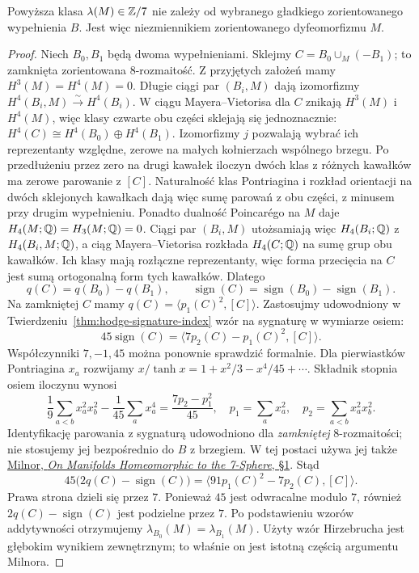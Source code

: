 \begin{twierdzenie}
\label{thm:milnor-invariant-25}
Powyższa klasa $\lambda(M)\in\mathbb{Z}/7$
nie zależy od wybranego gładkiego
zorientowanego wypełnienia $B$.
Jest więc niezmiennikiem
zorientowanego dyfeomorfizmu $M$.
\end{twierdzenie}
\begin{proof}
Niech $B_0,B_1$ będą dwoma
wypełnieniami. Sklejmy
$C=B_0\cup_M(-B_1)$;
to zamknięta zorientowana
$8$-rozmaitość. Z przyjętych założeń
mamy $H^3(M)=H^4(M)=0$.
Długie ciągi par $(B_i,M)$ dają
izomorfizmy
$H^4(B_i,M)\xrightarrow{\sim}H^4(B_i)$.
W ciągu Mayera--Vietorisa dla $C$
znikają $H^3(M)$ i $H^4(M)$,
więc klasy czwarte obu części
sklejają się jednoznacznie:
$H^4(C)\cong H^4(B_0)\oplus H^4(B_1)$.
Izomorfizmy $j$ pozwalają wybrać
ich reprezentanty względne, zerowe
na małych kołnierzach wspólnego brzegu.
Po przedłużeniu przez zero na drugi
kawałek iloczyn dwóch klas z różnych
kawałków ma zerowe parowanie z $[C]$.
Naturalność klas Pontriagina i rozkład
orientacji na dwóch sklejonych
kawałkach dają więc
sumę parowań z obu części, z minusem
przy drugim wypełnieniu. Ponadto
dualność Poincarégo na $M$ daje
$H_4(M;\mathbb{Q})=H_3(M;\mathbb{Q})=0$.
Ciągi par $(B_i,M)$ utożsamiają więc
$H_4(B_i;\mathbb{Q})$ z $H_4(B_i,M;\mathbb{Q})$,
a ciąg Mayera--Vietorisa rozkłada
$H_4(C;\mathbb{Q})$ na sumę grup obu kawałków.
Ich klasy mają rozłączne reprezentanty,
więc forma przecięcia na $C$ jest
sumą ortogonalną form tych kawałków.
Dlatego
\[
 q(C)=q(B_0)-q(B_1),\qquad
 \operatorname{sign}(C)
  =\operatorname{sign}(B_0)
   -\operatorname{sign}(B_1).
\]
Na zamkniętej $C$ mamy
$q(C)=\langle p_1(C)^2,[C]\rangle$.
Zastosujmy udowodniony w
Twierdzeniu~\ref{thm:hodge-signature-index}
wzór na sygnaturę w wymiarze osiem:
\[
 45\operatorname{sign}(C)=
 \langle 7p_2(C)-p_1(C)^2,[C]\rangle.
\]
Współczynniki $7,-1,45$ można ponownie
sprawdzić formalnie. Dla pierwiastków
Pontriagina $x_a$ rozwijamy
$x/\tanh x=1+x^2/3-x^4/45+\cdots$.
Składnik stopnia osiem iloczynu wynosi
\[
 \frac1{9}\sum_{a<b}x_a^2x_b^2
 -\frac1{45}\sum_a x_a^4
 =\frac{7p_2-p_1^2}{45},
 \quad p_1=\sum_a x_a^2,\quad
 p_2=\sum_{a<b}x_a^2x_b^2.
\]
Identyfikację parowania z sygnaturą
udowodniono dla \emph{zamkniętej}
$8$-rozmaitości; nie stosujemy jej
bezpośrednio do $B$ z brzegiem. W tej
postaci używa jej także
\href{https://sites.math.rutgers.edu/~feehan/teaching/math866/milnor7sphere.pdf}
{Milnor, \emph{On Manifolds Homeomorphic
to the 7-Sphere}, §1}.
Stąd
\[
 45\bigl(2q(C)-\operatorname{sign}(C)\bigr)
 =
 \langle 91p_1(C)^2-7p_2(C),[C]\rangle.
\]
Prawa strona dzieli się przez $7$.
Ponieważ $45$ jest odwracalne
modulo $7$, również
$2q(C)-\operatorname{sign}(C)$
jest podzielne przez $7$.
Po podstawieniu wzorów
addytywności otrzymujemy
$\lambda_{B_0}(M)=\lambda_{B_1}(M)$.
Użyty wzór Hirzebrucha jest
głębokim wynikiem zewnętrznym;
to właśnie on jest istotną
częścią argumentu Milnora.
\end{proof}

